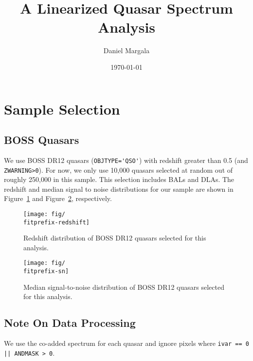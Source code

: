 \documentclass[oneside,10pt]{article}
\title{A Linearized Quasar Spectrum Analysis}
\author{Daniel Margala}
\date{\today}
\providecommand{\fig}[1]{Figure~\ref{fig:#1}}
\providecommand{\fitprefix}{random-n10000}
\begin{document}
\maketitle


\section{Sample Selection}

\subsection{BOSS Quasars}

We use BOSS DR12 quasars (\verb+OBJTYPE='QSO'+) with redshift greater than 0.5 (and \verb+ZWARNING>0+). For now, we only use  
10,000 quasars selected at random out of roughly 250,000 in this sample. This selection includes BALs and DLAs.
The redshift and median signal to noise distributions for our sample are shown in \fig{redshiftDistribution} and \fig{snDistribution}, respectively.   

\begin{figure}
\texttt{[image: fig/\\fitprefix-redshift]}
\centering
\caption{Redshift distribution of BOSS DR12 quasars selected for this analysis.}
\label{fig:redshiftDistribution}
\end{figure}

\begin{figure}
\texttt{[image: fig/\\fitprefix-sn]}
\centering
\caption{Median signal-to-noise distribution of BOSS DR12 quasars selected for this analysis.}
\label{fig:snDistribution}
\end{figure}

\subsection{Note On Data Processing}

We use the co-added spectrum for each quasar and ignore pixels where \verb+ivar == 0 || ANDMASK > 0+. 
\end{document}
